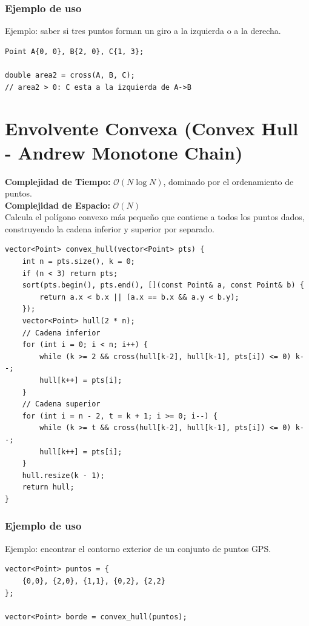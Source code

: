 \documentclass[10pt,twocolumn,letterpaper]{report}
\begin{document}
\subsubsection*{Ejemplo de uso}
Ejemplo: saber si tres puntos forman un giro a la izquierda o a la derecha.
\begin{lstlisting}
Point A{0, 0}, B{2, 0}, C{1, 3};

double area2 = cross(A, B, C);
// area2 > 0: C esta a la izquierda de A->B
\end{lstlisting}

\section{Envolvente Convexa (Convex Hull - Andrew Monotone Chain)}
\textbf{Complejidad de Tiempo:} $\mathcal{O}(N \log N)$, dominado por el ordenamiento de puntos. \\
\textbf{Complejidad de Espacio:} $\mathcal{O}(N)$ \\
Calcula el polígono convexo más pequeño que contiene a todos los puntos dados, construyendo la cadena inferior y superior por separado.
\begin{lstlisting}
vector<Point> convex_hull(vector<Point> pts) {
    int n = pts.size(), k = 0;
    if (n < 3) return pts;
    sort(pts.begin(), pts.end(), [](const Point& a, const Point& b) {
        return a.x < b.x || (a.x == b.x && a.y < b.y);
    });
    vector<Point> hull(2 * n);
    // Cadena inferior
    for (int i = 0; i < n; i++) {
        while (k >= 2 && cross(hull[k-2], hull[k-1], pts[i]) <= 0) k--;
        hull[k++] = pts[i];
    }
    // Cadena superior
    for (int i = n - 2, t = k + 1; i >= 0; i--) {
        while (k >= t && cross(hull[k-2], hull[k-1], pts[i]) <= 0) k--;
        hull[k++] = pts[i];
    }
    hull.resize(k - 1);
    return hull;
}
\end{lstlisting}
\subsubsection*{Ejemplo de uso}
Ejemplo: encontrar el contorno exterior de un conjunto de puntos GPS.
\begin{lstlisting}
vector<Point> puntos = {
    {0,0}, {2,0}, {1,1}, {0,2}, {2,2}
};

vector<Point> borde = convex_hull(puntos);
\end{lstlisting}
\end{document}
